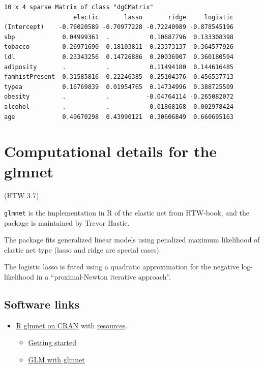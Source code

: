 \documentclass[
  letterpaper,
  DIV=11,
  numbers=noendperiod]{scrartcl}
\providecommand{\tightlist}{%
  \setlength{\itemsep}{0pt}\setlength{\parskip}{0pt}}\usepackage{longtable,booktabs,array}
\begin{document}
\begin{verbatim}
10 x 4 sparse Matrix of class "dgCMatrix"
                   elactic       lasso       ridge     logistic
(Intercept)    -0.76020589 -0.70977228 -0.72240989 -0.878545196
sbp             0.04999361  .           0.10687796  0.133308398
tobacco         0.26971690  0.18103811  0.23373137  0.364577926
ldl             0.23343256  0.14726886  0.20036907  0.360180594
adiposity       .           .           0.11494180  0.144616485
famhistPresent  0.31585816  0.22246385  0.25104376  0.456537713
typea           0.16769839  0.01954765  0.14734996  0.388725509
obesity         .           .          -0.04764114 -0.265082072
alcohol         .           .           0.01868168  0.002978424
age             0.49670298  0.43990121  0.30606849  0.660695163
\end{verbatim}

\hypertarget{computational-details-for-the-glmnet}{%
\section{Computational details for the
glmnet}\label{computational-details-for-the-glmnet}}

(HTW 3.7)

\texttt{glmnet} is the implementation in R of the elastic net from
HTW-book, and the package is maintained by Trevor Hastie.

The package fits generalized linear models using penalized maximum
likelihood of elastic net type (lasso and ridge are special cases).

The logistic lasso is fitted using a quadratic approximation for the
negative log-likelihood in a ``proximal-Newton iterative approach''.

\hypertarget{software-links}{%
\subsection{Software links}\label{software-links}}

\begin{itemize}
\tightlist
\item
  \href{https://cran.r-project.org/web/packages/glmnet/index.html}{R
  glmnet on CRAN} with
  \href{http://www.stanford.edu/~hastie/glmnet}{resources}.

  \begin{itemize}
  \tightlist
  \item
    \href{https://glmnet.stanford.edu/articles/glmnet.html}{Getting
    started}
  \item
    \href{https://glmnet.stanford.edu/articles/glmnetFamily.html}{GLM
    with glmnet}
  \end{itemize}
\end{itemize}
\end{document}
